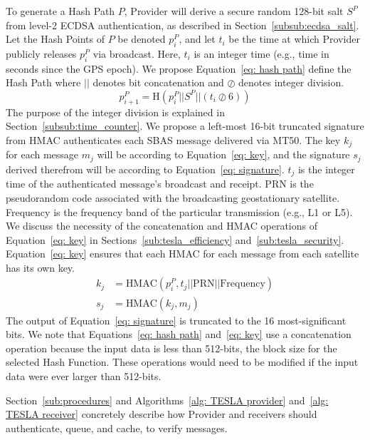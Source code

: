 \documentclass[APA,STIX1COL]{IONjournal/ION-APA Template}
\begin{document}
		To generate a Hash Path $P$, Provider will derive a secure random 128-bit salt $S^P$ from level-2 ECDSA authentication, as described in Section~\ref{subsub:ecdsa_salt}.
		Let the Hash Points of $P$ be denoted $p^P_i$, and let $t_i$ be the time at which Provider publicly releases $p^P_i$ via broadcast.
		Here, $t_i$ is an integer time (e.g., time in seconds since the GPS epoch).
		We propose Equation~\eqref{eq: hash path} define the Hash Path where $||$ denotes bit concatenation and $\oslash$ denotes integer division.
		\begin{equation}
			p^P_{i+1} = \textrm{H} \left(p^P_i || S^P || (t_i \oslash 6) \right) \label{eq: hash path}
		\end{equation}
		The purpose of the integer division is explained in Section~\ref{subsub:time_counter}.
		We propose a left-most 16-bit truncated signature from HMAC authenticates each SBAS message delivered via MT50.
		The key $k_j$ for each message $m_j$ will be according to Equation~\eqref{eq: key}, and the signature $s_j$ derived therefrom will be according to Equation~\eqref{eq: signature}.
		$t_j$ is the integer time of the authenticated message's broadcast and receipt.
		PRN is the pseudorandom code associated with the broadcasting geostationary satellite.
		Frequency is the frequency band of the particular transmission (e.g., L1 or L5).
		We discuss the necessity of the concatenation and HMAC operations of Equation~\eqref{eq: key} in Sections~\ref{sub:tesla_efficiency} and~\ref{sub:tesla_security}.
		Equation~\eqref{eq: key} ensures that each HMAC for each message from each satellite has its own key. 
		\begin{align}
			k_j &= \textrm{HMAC}(p^P_i, t_j || \textrm{PRN} || \textrm{Frequency} \label{eq: key}) \\
			s_j &= \textrm{HMAC}(k_j, m_j) \label{eq: signature}
		\end{align}
		The output of Equation~\eqref{eq: signature} is truncated to the 16 most-significant bits.
		We note that Equations~\eqref{eq: hash path} and~\eqref{eq: key} use a concatenation operation because the input data is less than 512-bits, the block size for the selected Hash Function.
		These operations would need to be modified if the input data were ever larger than 512-bits.

		Section~\ref{sub:procedures} and Algorithms~\ref{alg: TESLA provider} and~\ref{alg: TESLA receiver} concretely describe how Provider and receivers should authenticate, queue, and cache, to verify messages.
\end{document}
